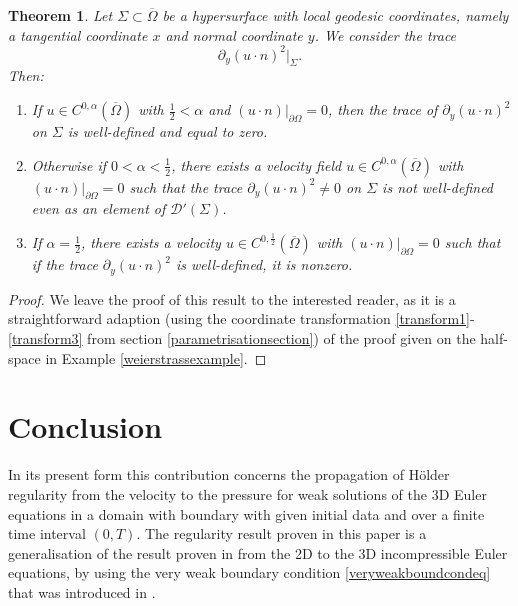 \documentclass[12pt,a4paper]{article}
\newtheorem{theorem}{Theorem}[section]
\theoremstyle{definition}
\theoremstyle{remark}
\numberwithin{equation}{section}
\def \del {\partial}
\begin{document}
\begin{theorem} \label{generaldomainweierstrass}
Let $\Sigma \subset \overline{\Omega}$ be a hypersurface with local geodesic coordinates, namely a tangential coordinate $x$ and normal coordinate $y$. We consider the trace
\begin{equation*}
\del_y(u \cdot n)^2 \lvert_{\Sigma}.
\end{equation*}
Then: 
\begin{enumerate}
    \item If $u\in C^{0,\alpha}(\overline \Omega)$ with $\frac12<\alpha$ and $(u \cdot n)\lvert_{\partial \Omega} = 0$, then the trace of $\del_y (u \cdot n)^2$ on $\Sigma$ is well-defined and equal to zero. 
    \item Otherwise if $0< \alpha < \frac12$, there exists a velocity field $u\in C^{0,\alpha}(\overline \Omega)$ with $(u \cdot n)\lvert_{\partial \Omega} = 0$ such that the trace $\del_y (u \cdot n)^2 \not=0$ on $\Sigma$ is not well-defined even as an element of $\mathcal D'(\Sigma)$.
    \item If $\alpha = \frac{1}{2}$, there exists a velocity $u\in C^{0,\frac{1}{2}}(\overline \Omega)$ with $(u \cdot n)\lvert_{\partial \Omega} = 0$ such that if the trace $\partial_y (u \cdot n)^2$ is well-defined, it is nonzero.
\end{enumerate}
\end{theorem}  
\begin{proof}
We leave the proof of this result to the interested reader, as it is a straightforward adaption (using the coordinate transformation \eqref{transform1}-\eqref{transform3} from section \ref{parametrisationsection}) of the proof given on the half-space in Example \ref{weierstrassexample}.
\end{proof}

\section{Conclusion}
In its present form this contribution concerns the propagation of Hölder regularity from the velocity to the pressure for weak solutions of the 3D Euler equations in a domain with boundary with given initial data and over a finite time interval $(0,T)$. The regularity result proven in this paper is a generalisation of the result proven in \cite{bardos2021} from the 2D to the 3D incompressible Euler equations, by using the very weak boundary condition \eqref{veryweakboundcondeq} that was introduced in \cite{bardos2021}.
\end{document}
